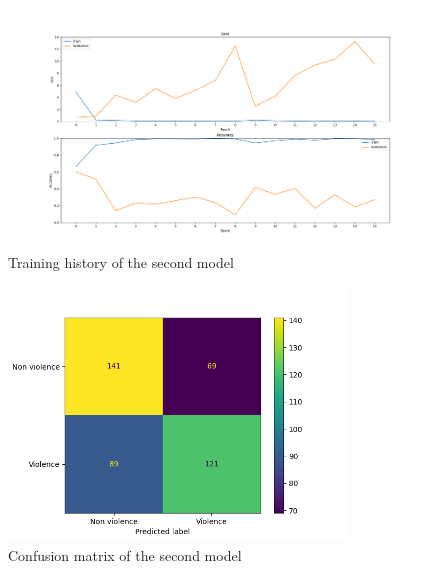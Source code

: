 \begin{figure}[]
    \centering
    \includegraphics[width=1\textwidth]{images/731a-2D35-86ad-history.png}
    \caption{Training history of the second model}
    \label{fig:Second2DCNNHistory}
\end{figure}


\begin{figure}[]
    \centering
    \includegraphics[width=0.8\textwidth]{images/731a-2D35-86ad-conf_matrix.png}
    \caption{Confusion matrix of the second model}
    \label{fig:Second2DCNNMatrix}
\end{figure}

\pagebreak
